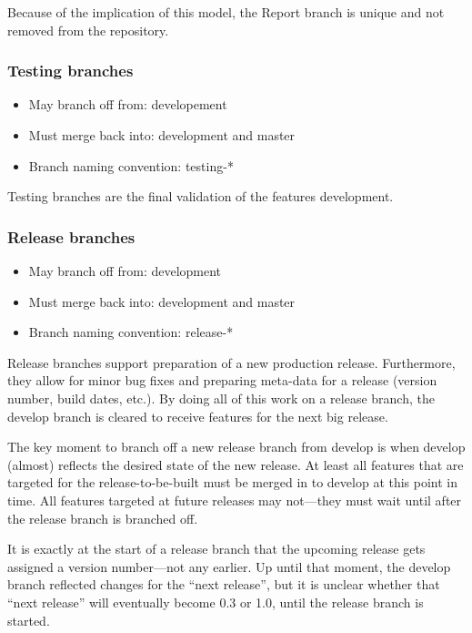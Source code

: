 Because of the implication of this model, the Report branch is unique and not
removed from the repository.

\subsubsection{Testing branches}
\begin{itemize}
  \item May branch off from: developement
  \item Must merge back into: development and master
  \item Branch naming convention: testing-*
\end{itemize}
Testing branches are the final validation of the features development.

\subsubsection{Release branches}
\begin{itemize}[itemsep=1pt, parsep=1pt]
  \item May branch off from: development
  \item Must merge back into: development and master
  \item Branch naming convention: release-*
\end{itemize}

Release branches support preparation of a new production release. Furthermore,
they allow for minor bug fixes and preparing meta-data for a release (version
number, build dates, etc.). By doing all of this work on a release branch, the
develop branch is cleared to receive features for the next big release.

The key moment to branch off a new release branch from develop is when develop
(almost) reflects the desired state of the new release. At least all features
that are targeted for the release-to-be-built must be merged in to develop at
this point in time. All features targeted at future releases may not—they must
wait until after the release branch is branched off.

It is exactly at the start of a release branch that the upcoming release gets
assigned a version number—not any earlier. Up until that moment, the develop
branch reflected changes for the “next release”, but it is unclear whether that
“next release” will eventually become 0.3 or 1.0, until the release branch is
started.

